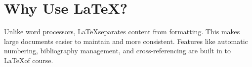 \section{Why Use \LaTeX?}
Unlike word processors,
\LaTeX separates content from formatting. This makes large documents easier to maintain and more consistent. Features like automatic numbering, bibliography management, and cross-referencing are built in to
\LaTeX of course.

